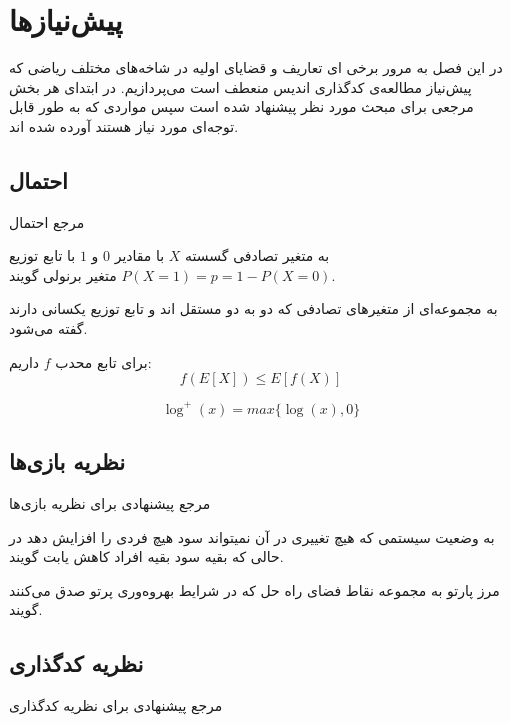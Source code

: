 \chapter{پیش‌نیازها}
\label{chapter:preliminaries}
در این فصل به مرور برخی ای تعاریف و قضایای اولیه در شاخه‌های مختلف ریاضی که پیش‌نیاز مطالعه‌ی کدگذاری اندیس منعطف است می‌پردازیم. در ابتدای هر بخش مرجعی برای مبحث مورد نظر پیشنهاد شده است سپس مواردی که به طور قابل توجه‌ای مورد نیاز هستند آورده شده اند.

\section{احتمال}
مرجع احتمال
\cite{book:pro}

\begin{definition}
	به متغیر تصادفی گسسته
	$X$
	با مقادیر
	$0$
	و
	$1$
	با تابع توزیع
	$P(X = 1) = p = 1 - P(X = 0)$
	متغیر برنولی گویند.
\end{definition}
\begin{definition}
به مجموعه‌ای از متغیرهای تصادفی که دو به دو مستقل اند و تابع توزیع یکسانی دارند گفته می‌شود.
\end{definition}
\begin{theorem}
	\label{Jensen}
	برای تابع محدب
	$f$
	داریم:
	$$f(E[X]) \leq E[f(X)]$$
\end{theorem}

$$\log^{+}(x) = max\{\log(x), 0\}$$
\section{نظریه بازی‌ها}
مرجع پیشنهادی برای نظریه بازی‌ها
\cite{book:game}

\begin{definition}
	\label{def:Pareto}
	به وضعیت سیستمی که هیچ تغییری در آن نمیتواند سود هیچ فردی را افزایش دهد
	در حالی که بقیه سود بقیه افراد کاهش یابت گویند.
	\cite{wiki:pareto}
	
	مرز پارتو
	\label{def:Pareto-boundary}
	به مجموعه نقاط فضای راه حل که در شرایط بهروه‌وری پرتو صدق می‌کنند گویند.
\end{definition}

\section{نظریه کدگذاری}
مرجع پیشنهادی برای نظریه کدگذاری
\cite{book:coding}

